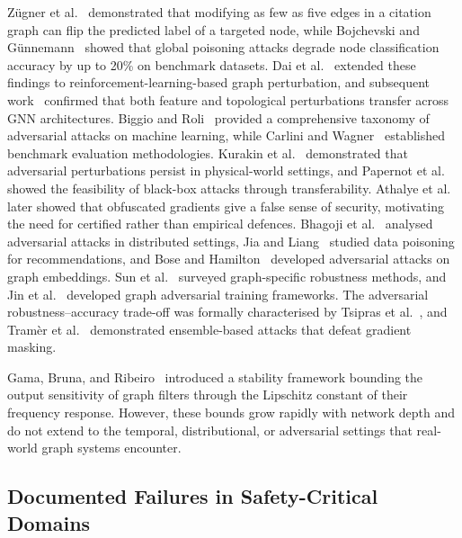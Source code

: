 Z\"{u}gner et al.~\cite{Zuegner2018} demonstrated that modifying as few as five edges in a citation graph can flip the predicted label of a targeted node, while Bojchevski and G\"{u}nnemann~\cite{Bojchevski2019} showed that global poisoning attacks degrade node classification accuracy by up to 20\% on benchmark datasets. Dai et al.~\cite{Dai2018} extended these findings to reinforcement-learning-based graph perturbation, and subsequent work~\cite{Xu2019b,Wu2019} confirmed that both feature and topological perturbations transfer across GNN architectures. Biggio and Roli~\cite{Biggio2018} provided a comprehensive taxonomy of adversarial attacks on machine learning, while Carlini and Wagner~\cite{Carlini2017} established benchmark evaluation methodologies. Kurakin et al.~\cite{Kurakin2017} demonstrated that adversarial perturbations persist in physical-world settings, and Papernot et al.~\cite{Papernot2016,Papernot2017pate} showed the feasibility of black-box attacks through transferability. Athalye et al.~\cite{Athalye2018} later showed that obfuscated gradients give a false sense of security, motivating the need for certified rather than empirical defences. Bhagoji et al.~\cite{Bhagoji2019} analysed adversarial attacks in distributed settings, Jia and Liang~\cite{Jia2019} studied data poisoning for recommendations, and Bose and Hamilton~\cite{Bose2020} developed adversarial attacks on graph embeddings. Sun et al.~\cite{Sun2022gnn_robustness} surveyed graph-specific robustness methods, and Jin et al.~\cite{Jin2020} developed graph adversarial training frameworks. The adversarial robustness--accuracy trade-off was formally characterised by Tsipras et al.~\cite{Tsipras2019}, and Tram\`{e}r et al.~\cite{Tramer2018} demonstrated ensemble-based attacks that defeat gradient masking.

Gama, Bruna, and Ribeiro~\cite{Gama2020} introduced a stability framework bounding the output sensitivity of graph filters through the Lipschitz constant of their frequency response. However, these bounds grow rapidly with network depth and do not extend to the temporal, distributional, or adversarial settings that real-world graph systems encounter.


\subsection{Documented Failures in Safety-Critical Domains}

